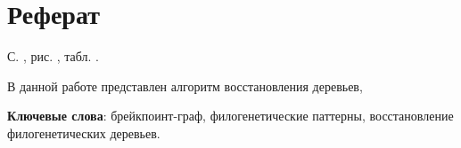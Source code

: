 \thispagestyle{empty}
\setcounter{page}{1}

\section*{Реферат}
\noindent
С. ,  рис. , табл. .

В данной работе представлен алгоритм восстановления деревьев,

\textbf{Ключевые слова}: брейкпоинт-граф, филогенетические паттерны, восстановление филогенетических деревьев.

\pagebreak
